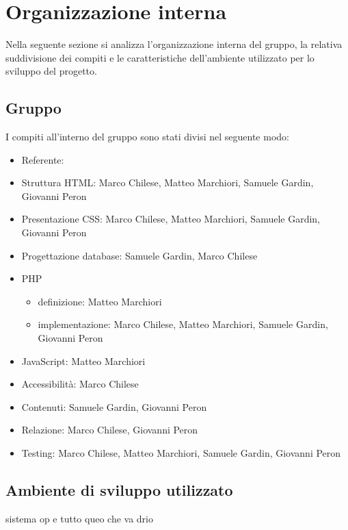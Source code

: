 \section{Organizzazione interna}
Nella seguente sezione si analizza l'organizzazione interna del gruppo, la relativa suddivisione dei compiti e le caratteristiche dell'ambiente utilizzato per lo sviluppo del progetto.
\subsection{Gruppo}
I compiti all'interno del gruppo sono stati divisi nel seguente modo:
\begin{itemize}
\item Referente:
\item Struttura HTML: Marco Chilese, Matteo Marchiori, Samuele Gardin, Giovanni Peron
\item Presentazione CSS: Marco Chilese, Matteo Marchiori, Samuele Gardin, Giovanni Peron
\item Progettazione database: Samuele Gardin, Marco Chilese
\item PHP
\begin{itemize}
	\item definizione: Matteo Marchiori
	\item implementazione: Marco Chilese, Matteo Marchiori, Samuele Gardin, Giovanni Peron
\end{itemize}
\item JavaScript: Matteo Marchiori
\item Accessibilità: Marco Chilese
\item Contenuti: Samuele Gardin, Giovanni Peron
\item Relazione: Marco Chilese, Giovanni Peron
\item Testing: Marco Chilese, Matteo Marchiori, Samuele Gardin, Giovanni Peron
\end{itemize}
\subsection{Ambiente di sviluppo utilizzato}
sistema op e tutto queo che va drio

